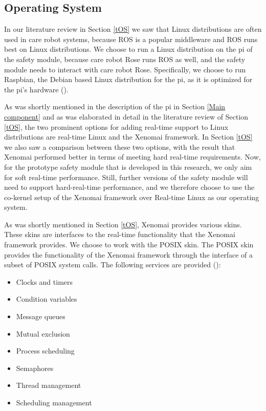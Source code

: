 \documentclass[12pt]{scrreprt}
\begin{document}
\subsection{Operating System}
\label{Operating System}
In our literature review in Section \ref{tOS} we saw that Linux distributions are often used in care robot systems, because ROS is a popular middleware and ROS runs best on Linux distributions. We choose to run a Linux distribution on the \gls{pi} of the safety module, because care robot Rose runs ROS as well, and the safety module needs to interact with care robot Rose. Specifically, we choose to run Raspbian, the Debian based Linux distribution for the \gls{pi}, as it is optimized for the \gls{pi}'s hardware (\cite{raspbian}).
\par
As was shortly mentioned in the description of the \gls{pi} in Section \ref{Main component} and as was elaborated in detail in the literature review of Section \ref{tOS}, the two prominent options for adding real-time support to Linux distributions are real-time Linux and the Xenomai framework. In Section \ref{tOS} we also saw a comparison between these two options, with the result that Xenomai performed better in terms of meeting hard real-time requirements. Now, for the prototype safety module that is developed in this research, we only aim for soft real-time performance. Still, further versions of the safety module will need to support hard-real-time performance, and we therefore choose to use the co-kernel setup of the Xenomai framework over Real-time Linux as our operating system.
\par 
As was shortly mentioned in Section \ref{tOS}, Xenomai provides various skins. These skins are interfaces to the real-time functionality that the Xenomai framework provides. We choose to work with the POSIX skin. The POSIX skin provides the functionality of the Xenomai framework through the interface of a subset of POSIX system calls. The following services are provided (\cite{posix_xenomai}):

\begin{itemize}\label{posix_wrapped}
    \item Clocks and timers
    \item Condition variables
    \item Message queues
    \item Mutual exclusion 
    \item Process scheduling 
    \item Semaphores
    \item Thread management
    \item Scheduling management
\end{itemize}
\end{document}
